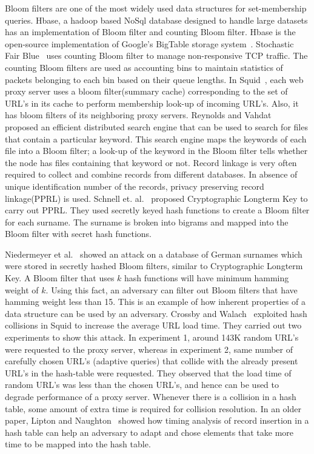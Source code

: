 Bloom filters are one of the most widely used data structures for set-membership queries. Hbase, a hadoop based NoSql database designed to handle large datasets has an implementation of Bloom filter and counting Bloom filter. Hbase is the open-source implementation of Google's BigTable storage system~\cite{chang2008bigtable}. Stochastic Fair Blue~\cite{feng2001stochastic} uses counting Bloom filter to manage non-responsive TCP traffic. The counting Bloom filters are used as accounting bins to maintain statistics of packets belonging to each bin based on their queue lengths. In Squid~\cite{fan2000summary}, each web proxy server uses a bloom filter(summary cache) corresponding to the set of URL's in its cache to perform membership look-up of incoming URL's. Also, it has bloom filters of its neighboring proxy servers. Reynolds and Vahdat~\cite{reynolds2003efficient} proposed an efficient distributed search engine that can be used to search for files that contain a particular keyword. This search engine maps the keywords of each file into a Bloom filter; a look-up of the keyword in the Bloom filter tells whether the node has files containing that keyword or not. Record linkage is very often required to collect and combine records from different databases. In absence of unique identification number of the records, privacy preserving record linkage(PPRL) is used. Schnell et. al.~\cite{schnell2011novel} proposed Cryptographic Longterm Key to carry out PPRL. They used secretly keyed hash functions to create a Bloom filter for each surname. The surname is broken into bigrams and mapped into the Bloom filter with secret hash functions. 

Niedermeyer et al.~\cite{niedermeyer2014cryptanalysis} showed an attack on a database of German surnames which were stored in secretly hashed Bloom filters, similar to Cryptographic Longterm Key. A Bloom filter that uses $k$ hash functions will have minimum hamming weight of $k$. Using this fact, an adversary can filter out Bloom filters that have hamming weight less than 15. This is an example of how inherent properties of a data structure can be used by an adversary. Crossby and Walach~\cite{crosby2003denial} exploited hash collisions in Squid to increase the average URL load time. They carried out two experiments to show this attack. In experiment 1, around 143K random URL's were requested to the proxy server, whereas in experiment 2, same number of carefully chosen URL's (adaptive queries) that collide with the already present URL's in the hash-table were requested. They observed that the load time of random URL's was less than the chosen URL's, and hence can be used to degrade performance of a proxy server. Whenever there is a collision in a hash table, some amount of extra time is required for collision resolution. In an older paper, Lipton and Naughton~\cite{lipton1993clocked} showed how timing analysis of record insertion in a hash table can help an adversary to adapt and chose elements that take more time to be mapped into the hash table.